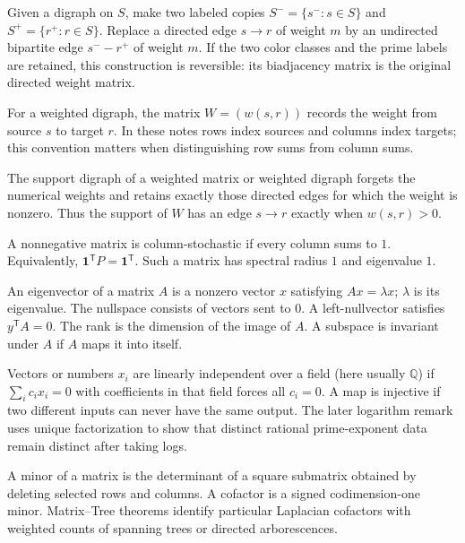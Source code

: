 \documentclass[11pt]{article}
\theoremstyle{definition}
\theoremstyle{remark}
\newcommand{\one}{\mathbf{1}}
\begin{document}
\begin{description}[style=nextline,leftmargin=1.5em]
\item[Source--target bipartite graph.]
Given a digraph on $S$, make two labeled copies $S^- =\{s^-:s\in S\}$ and
$S^+=\{r^+:r\in S\}$.  Replace a directed edge $s\to r$ of weight $m$ by
an undirected bipartite edge $s^-\!\! -\!\! r^+$ of weight $m$.  If the two
color classes and the prime labels are retained, this construction is
reversible: its biadjacency matrix is the original directed weight matrix.

\item[Adjacency/weight matrix.]
For a weighted digraph, the matrix $W=(w(s,r))$ records the weight from source
$s$ to target $r$.  In these notes rows index sources and columns index
targets; this convention matters when distinguishing row sums from column
sums.

\item[Support digraph.]
The support digraph of a weighted matrix or weighted digraph forgets the
numerical weights and retains exactly those directed edges for which the
weight is nonzero.  Thus the support of $W$ has an edge $s\to r$ exactly when
$w(s,r)>0$.

\item[Column-stochastic matrix.]
A nonnegative matrix is column-stochastic if every column sums to $1$.
Equivalently, $\one^{\mathsf T}P=\one^{\mathsf T}$.  Such a matrix has
spectral radius $1$ and eigenvalue $1$.

\item[Eigenvalue, eigenvector, nullspace, rank, and invariant subspace.]
An eigenvector of a matrix $A$ is a nonzero vector $x$ satisfying
$Ax=\lambda x$; $\lambda$ is its eigenvalue.  The nullspace consists of
vectors sent to $0$.  A left-nullvector satisfies $y^{\mathsf T}A=0$.  The
rank is the dimension of the image of $A$.  A subspace is invariant under
$A$ if $A$ maps it into itself.

\item[Linear independence and injectivity.]
Vectors or numbers $x_i$ are linearly independent over a field (here usually
$\mathbb Q$) if $\sum_i c_i x_i=0$ with coefficients in that field forces
all $c_i=0$.  A map is injective if two different inputs can never have the
same output.  The later logarithm remark uses unique factorization to show
that distinct rational prime-exponent data remain distinct after taking logs.

\item[Matrix minor and cofactor.]
A minor of a matrix is the determinant of a square submatrix obtained by
deleting selected rows and columns.  A cofactor is a signed codimension-one
minor.  Matrix--Tree theorems identify particular Laplacian cofactors with
weighted counts of spanning trees or directed arborescences.


\end{description}
\end{document}
